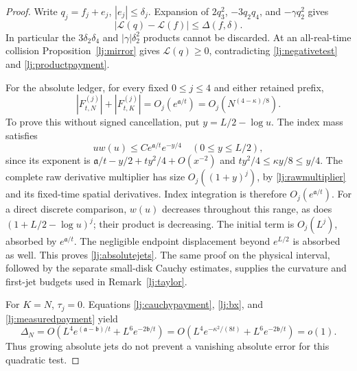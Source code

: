\documentclass[11pt]{article}
\numberwithin{equation}{section}
\theoremstyle{definition}
\theoremstyle{remark}
\begin{document}
\begin{proof}
Write \(q_j=f_j+e_j\), \(|e_j|\le\delta_j\).
Expansion of \(2q_3^2\), \(-3q_2q_4\), and \(-\gamma q_2^2\)
gives
\begin{equation}\label{lj:productpayment}
 |\mathscr L(q)-\mathscr L(f)|\le\Delta(f,\delta).
\end{equation}
In particular the \(3\delta_2\delta_4\) and
\(|\gamma|\delta_2^2\) products cannot be discarded.
At an all-real-time collision Proposition~\ref{lj:mirror} gives
\(\mathscr L(q)\ge0\), contradicting
\eqref{lj:negativetest} and \eqref{lj:productpayment}.

For the absolute ledger, for every fixed \(0\le j\le4\) and either
retained prefix,
\begin{equation}\label{lj:absolutejets}
 |F_{t,N}^{(j)}|+|F_{t,K}^{(j)}|
       =O_j(e^{\mathfrak a/t})
       =O_j(N^{(4-\kappa)/8}).
\end{equation}
To prove this without signed cancellation, put \(y=L/2-\log u\).
The index mass satisfies
\[
 uw(u)\le C e^{\mathfrak a/t}e^{-y/4}
                       \quad(0\le y\le L/2),
\]
since its exponent is
\(\mathfrak a/t-y/2+ty^2/4+O(x^{-2})\) and
\(ty^2/4\le\kappa y/8\le y/4\).
The complete raw derivative multiplier has size
\(O_j((1+y)^j)\), by \eqref{lj:rawmultiplier} and its fixed-time
spatial derivatives. Index integration is therefore
\(O_j(e^{\mathfrak a/t})\).
For a direct discrete comparison, \(w(u)\) decreases throughout this
range, as does \((1+L/2-\log u)^j\); their product is decreasing.
The initial term is \(O_j(L^j)\), absorbed by \(e^{\mathfrak a/t}\).
The negligible endpoint displacement beyond \(e^{L/2}\) is absorbed
as well. This proves \eqref{lj:absolutejets}.
The same proof on the physical interval, followed by the separate
small-disk Cauchy estimates, supplies the curvature and first-jet
budgets used in Remark~\ref{lj:taylor}.

For \(K=N\), \(\tau_j=0\). Equations
\eqref{lj:cauchypayment}, \eqref{lj:bx}, and
\eqref{lj:measuredpayment} yield
\begin{equation}\label{lj:fullquadraticpayment}
 \Delta_N=O\left(L^4e^{(\mathfrak a-\mathfrak b)/t}
                         +L^6e^{-2\mathfrak b/t}\right)
         =O\left(L^4e^{-\kappa^2/(8t)}
                         +L^6e^{-2\mathfrak b/t}\right)=o(1).
\end{equation}
Thus growing absolute jets do not prevent a vanishing absolute error
for this quadratic test.


\end{proof}
\end{document}
